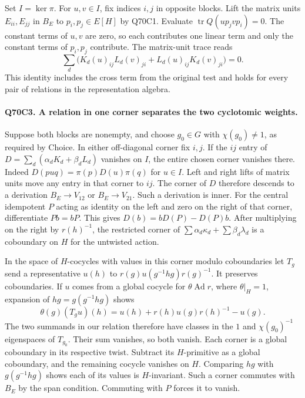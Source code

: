 Set $I=\ker\pi$. For $u,v\in I$, fix indices $i,j$ in opposite
blocks. Lift the matrix units $E_{ii},E_{jj}$ in $B_E$ to
$p_i,p_j\in E[H]$ by Q70C1. Evaluate
$\operatorname{tr}Q(u p_j v p_i)=0$. The constant terms of $u,v$
are zero, so each contributes one linear term and only the
constant terms of $p_i,p_j$ contribute. The matrix-unit trace reads
\[
 \sum_d\big(K_d(u)_{ij} L_d(v)_{ji}
              +L_d(u)_{ij} K_d(v)_{ji}\big)=0 .
\]
This identity includes the cross term from the original test and
holds for every pair of relations in the representation algebra.

\paragraph{Q70C3. A relation in one corner separates the two cyclotomic weights.}
Suppose both blocks are nonempty, and choose $g_0\in G$ with
$\chi(g_0)\ne1$, as required by Choice. In either off-diagonal
corner fix $i,j$. If the $ij$ entry of
$D=\sum_d(\alpha_d K_d+\beta_d L_d)$ vanishes on $I$, the
entire chosen corner vanishes there. Indeed
$D(puq)=\pi(p)D(u)\pi(q)$ for $u\in I$. Left and right lifts
of matrix units move any entry in that corner to $ij$.
The corner of $D$ therefore descends to a derivation
$B_E\to V_{12}$ or $B_E\to V_{21}$. Such a derivation is
inner. For the central idempotent $P$ acting as identity on the
left and zero on the right of that corner, differentiate
$P b=b P$. This gives $D(b)=bD(P)-D(P)b$.
After multiplying on the right by $r(h)^{-1}$, the restricted
corner of $\sum\alpha_d\kappa_d+\sum\beta_d\lambda_d$ is a
coboundary on $H$ for the untwisted action.

In the space of $H$-cocycles with values in this corner modulo
coboundaries let $T_g$ send a representative $u(h)$ to
$r(g)u(g^{-1}hg)r(g)^{-1}$. It preserves coboundaries. If $u$
comes from a global cocycle for $\theta\operatorname{Ad}r$,
where $\theta|_H=1$, expansion of $hg=g(g^{-1}hg)$ shows
\[
 \theta(g)(T_g u)(h)=u(h)+r(h)u(g)r(h)^{-1}-u(g).
\]
The two summands in our relation therefore have classes in the
$1$ and $\chi(g_0)^{-1}$ eigenspaces of $T_{g_0}$.
Their sum vanishes, so both vanish. Each corner is a global
coboundary in its respective twist. Subtract its $H$-primitive
as a global coboundary, and the remaining cocycle vanishes on
$H$. Comparing $hg$ with $g(g^{-1}hg)$ shows each of its values
is $H$-invariant. Such a corner commutes with $B_E$ by the span
condition. Commuting with $P$ forces it to vanish.

